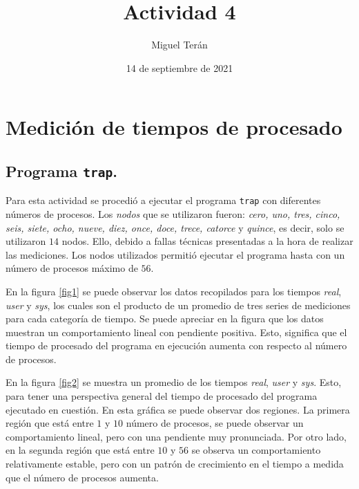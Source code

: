 \documentclass[twocolumn]{article}
\title{Actividad 4}
\author{Miguel Terán}
\date{14 de septiembre de 2021}
\begin{document}
\maketitle
\section{Medición de tiempos de procesado}
\subsection{Programa \texttt{trap}.}

Para esta actividad se procedió a ejecutar el programa \texttt{trap} con diferentes números de procesos. Los \textit{nodos} que se utilizaron fueron: \textit{cero, uno, tres, cinco, seis, siete, ocho, nueve, diez, once, doce, trece, catorce} y \textit{quince}, es decir, solo se utilizaron $14$ nodos. Ello, debido a fallas técnicas presentadas a la hora de realizar las mediciones. Los nodos utilizados permitió ejecutar el programa hasta con un número de procesos máximo de $56$.

En la figura \ref{fig1} se puede observar los datos recopilados para los tiempos \textit{real}, \textit{user} y \textit{sys}, los cuales son el producto de un promedio de tres series de mediciones para cada categoría de tiempo. Se puede apreciar en la figura que los datos muestran un comportamiento lineal con pendiente positiva. Esto, significa que el tiempo de procesado del programa en ejecución aumenta con respecto al número de procesos.

En la figura \ref{fig2} se muestra un promedio de los tiempos \textit{real}, \textit{user} y \textit{sys}. Esto, para tener una perspectiva general del tiempo de procesado del programa ejecutado en cuestión. En esta gráfica se puede observar dos regiones. La primera región que está entre $1$ y $10$ número de procesos, se puede observar un comportamiento lineal, pero con una pendiente muy pronunciada. Por otro lado, en la segunda región que está entre $10$ y $56$ se observa un comportamiento relativamente estable, pero con un patrón de crecimiento en el tiempo a medida que el número de procesos aumenta. 
\end{document}
